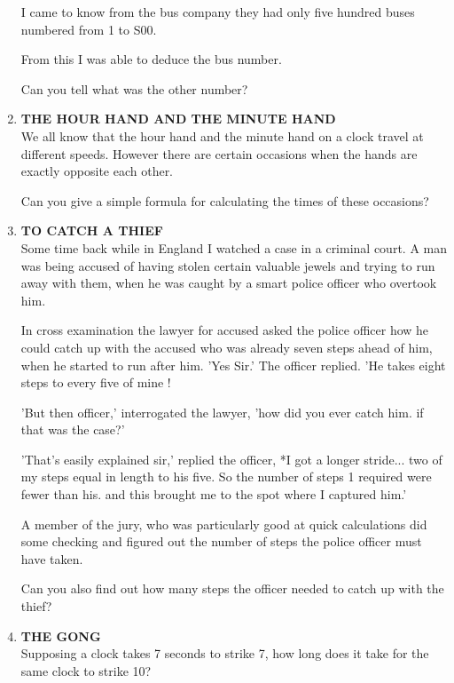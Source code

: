 \documentclass[12pt]{article}
\begin{document}
\begin{enumerate}
I came  to know  from  the bus  company  they  had only five hundred  buses  numbered  from  1 to S00. 

From  this  I was  able  to deduce  the bus number. 

Can you tell what  was the other  number? 

%
\item \textbf{THE  HOUR  HAND  AND  THE  MINUTE  HAND} \\
We all know  that  the  hour  hand  and  the  minute  hand on a clock  travel  at different  speeds.  However  there  are certain  occasions  when  the hands  are exactly  opposite  each other.  

Can  you  give  a simple  formula  for calculating the times  of these  occasions? 

%
\item \textbf{TO  CATCH  A THIEF} \\
Some  time  back  while  in England  I watched  a case in a criminal  court.  A man  was  being  accused  of having stolen  certain  valuable  jewels  and  trying  to run  away with them,  when  he was caught  by a smart  police  officer who overtook  him. 

In cross  examination  the lawyer  for accused  asked  the police  officer  how  he could  catch  up with  the accused  who was already  seven  steps  ahead  of him,  when  he started  to run after  him.  'Yes  Sir.'  The  officer  replied.  'He  takes eight  steps  to every  five of mine  ! 

'But then  officer,'  interrogated  the  lawyer,  'how  did you ever  catch  him.  if that was  the case?' 

'That's  easily  explained  sir,'  replied  the officer,  *I got a longer  stride...  two  of my steps  equal  in length  to his five. So  the number  of steps  1 required  were  fewer  than his. and this  brought  me  to the  spot  where  I captured him.' 

A member  of the  jury,  who  was particularly  good  at quick  calculations  did  some  checking  and  figured  out the number  of steps  the police  officer  must  have  taken. 

Can you also  find  out  how  many  steps  the  officer needed  to catch  up with  the thief? 

%
\item \textbf{THE  GONG} \\
Supposing  a clock  takes  7 seconds  to strike  7, how long does  it take  for the same  clock  to strike  10? 


\end{enumerate}
\end{document}
